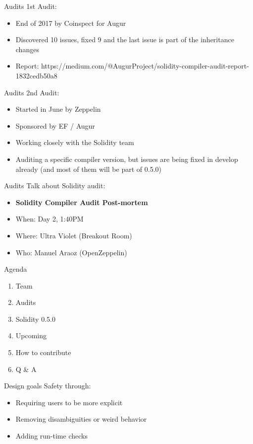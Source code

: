\documentclass[aspectratio=169,10pt]{beamer}
\begin{document}
\begin{frame}{Audits}
  1st Audit:
	\begin{itemize}
		\item End of 2017 by Coinspect for Augur
		\item Discovered 10 issues, fixed 9 and the last issue is part of the inheritance changes
		\item Report: https://medium.com/@AugurProject/solidity-compiler-audit-report-1832cedb50a8
	\end{itemize}
\end{frame}

\begin{frame}{Audits}
  2nd Audit:
	\begin{itemize}
		\item Started in June by Zeppelin
		\item Sponsored by EF / Augur
    \item Working closely with the Solidity team
    \item Auditing a specific compiler version, but issues are being fixed in develop already (and most of them will be part of 0.5.0)
	\end{itemize}
\end{frame}

\begin{frame}{Audits}
  Talk about Solidity audit:
  \begin{itemize}
    \item \textbf{Solidity Compiler Audit Post-mortem}
    \item When: Day 2, 1:40PM
    \item Where: Ultra Violet (Breakout Room)
    \item Who: Manuel Araoz (OpenZeppelin)
	\end{itemize}
\end{frame}

\begin{frame}{Agenda}
	\begin{enumerate}
  \item Team
  \item Audits
	\item \alert{Solidity 0.5.0}
	\item Upcoming
	\item How to contribute
	\item Q \& A
	\end{enumerate}
\end{frame}

\begin{frame}{Design goals}
  Safety through:
	\begin{itemize}
		\item Requiring users to be more explicit
		\item Removing disambiguities or weird behavior
		\item Adding run-time checks
	\end{itemize}
\end{frame}
\end{document}

